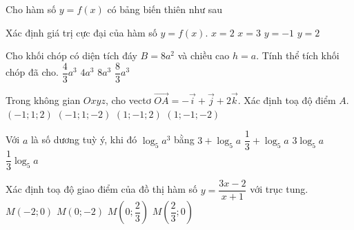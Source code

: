 \begin{ex}%
	Cho hàm số $y=f(x)$ có bảng biến thiên như sau
	\begin{center}
	\end{center}
	Xác định giá trị cực đại của hàm số $y=f(x)$.
	\choice
	{$x=2$}
	{$x=3$}
	{$y=-1$}
	{\True $y=2$}
\end{ex}
\begin{ex}%
	Cho khối chóp có diện tích đáy $B=8a^2$ và chiều cao $h=a$. Tính thể tích khối chóp đã cho.
	\choice
	{$\dfrac{4}{3}a^3$}
	{$4a^3$}
	{$8a^3$}
	{\True $\dfrac{8}{3}a^3$}
\end{ex}
\begin{ex}%
	Trong không gian $Oxyz$, cho vectơ $\overrightarrow{OA}=-\vec{i}+\vec{j}+2\vec{k}$. Xác định toạ độ điểm $A$.
	\choice
	{\True $(-1;1;2)$}
	{$(-1;1;-2)$}
	{$(1;-1;2)$}
	{$(1;-1;-2)$}
\end{ex}
\begin{ex}%
	Với $a$ là số dương tuỳ ý, khi đó $\log_5 a^3$ bằng
	\choice
	{$3+\log_5 a$}
	{$\dfrac{1}{3}+\log_5 a$}
	{\True $3 \log_5 a$}
	{$\dfrac{1}{3} \log_5 a$}
\end{ex}
\begin{ex}%
	Xác định toạ độ giao điểm của đồ thị hàm số $y=\dfrac{3x-2}{x+1}$ với trục tung.
	\choice
	{$M(-2;0)$}
	{\True $M(0;-2)$}
	{$M\left(0;\dfrac{2}{3}\right)$}
	{$M\left(\dfrac{2}{3};0\right)$}
\end{ex}
